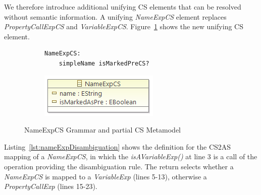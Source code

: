 \documentclass{llncs}
\begin{document}
We therefore introduce additional unifying CS elements that can be resolved without semantic information.  A unifying \emph{NameExpCS} element replaces \emph{PropertyCallExpCS} and \emph{VariableExpCS}.
Figure~\ref{fig:NameExpCS} shows the new unifying CS element.


\begin{figure}[htbp]
\centering
\begin{subfigure}{0.5\textwidth}
  \centering
 \begin{lstlisting}[label=lst:NameExpEBNF, language=Xtext]
 NameExpCS:
 	simpleName isMarkedPreCS?
 \end{lstlisting} 
\end{subfigure}%
\begin{subfigure}{0.5\textwidth}
  \centering
  \includegraphics[scale=0.75]{images/NameExpCS.png}
\end{subfigure}
\caption{NameExpCS Grammar and partial CS Metamodel}
\label{fig:NameExpCS}
\end{figure}

Listing~\ref{lst:nameExpDisambiguation} shows the definition for the CS2AS mapping of a \emph{NameExpCS}, in which the \emph{isAVariableExp()} at line 3 is a call of the operation providing the disambiguation rule. The return selects whether a \emph{NameExpCS} is mapped to a \emph{VariableExp} (lines 5-13), otherwise a  \emph{PropertyCallExp} (lines 15-23).

\end{document}
